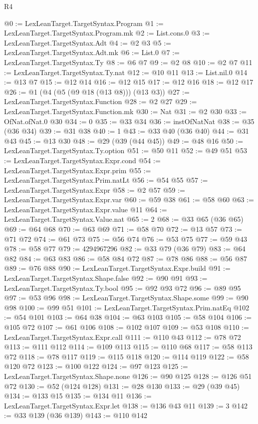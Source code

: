 \begin{lexlean}{R4}
\begin{coremodule}
@0 := LexLeanTarget.TargetSyntax.Program
@1 := LexLeanTarget.TargetSyntax.Program.mk
@2 := List.cons.{0}
@3 := LexLeanTarget.TargetSyntax.Adt
@4 := @2 @3
@5 := LexLeanTarget.TargetSyntax.Adt.mk
@6 := List.{0}
@7 := LexLeanTarget.TargetSyntax.Ty
@8 := @6 @7
@9 := @2 @8
@10 := @2 @7
@11 := LexLeanTarget.TargetSyntax.Ty.nat
@12 := @10 @11
@13 := List.nil.{0}
@14 := @13 @7
@15 := @12 @14
@16 := @12 @15
@17 := @12 @16
@18 := @12 @17
@26 := @1 (@4 (@5 (@9 @18 (@13 @8))) (@13 @3))
@27 := LexLeanTarget.TargetSyntax.Function
@28 := @2 @27
@29 := LexLeanTarget.TargetSyntax.Function.mk
@30 := Nat
@31 := @2 @30
@33 := OfNat.ofNat.{0} @30
@34 := 0
@35 := @33 @34
@36 := instOfNatNat
@38 := @35 (@36 @34)
@39 := @31 @38
@40 := 1
@43 := @33 @40 (@36 @40)
@44 := @31 @43
@45 := @13 @30
@48 := @29 (@39 (@44 @45))
@49 := @48 @16
@50 := LexLeanTarget.TargetSyntax.Ty.option
@51 := @50 @11
@52 := @49 @51
@53 := LexLeanTarget.TargetSyntax.Expr.cond
@54 := LexLeanTarget.TargetSyntax.Expr.prim
@55 := LexLeanTarget.TargetSyntax.Prim.natLt
@56 := @54 @55
@57 := LexLeanTarget.TargetSyntax.Expr
@58 := @2 @57
@59 := LexLeanTarget.TargetSyntax.Expr.var
@60 := @59 @38
@61 := @58 @60
@63 := LexLeanTarget.TargetSyntax.Expr.value @11
@64 := LexLeanTarget.TargetSyntax.Value.nat
@65 := 2
@68 := @33 @65 (@36 @65)
@69 := @64 @68
@70 := @63 @69
@71 := @58 @70
@72 := @13 @57
@73 := @71 @72
@74 := @61 @73
@75 := @56 @74
@76 := @53 @75
@77 := @59 @43
@78 := @58 @77
@79 := 4294967296
@82 := @33 @79 (@36 @79)
@83 := @64 @82
@84 := @63 @83
@86 := @58 @84 @72
@87 := @78 @86
@88 := @56 @87
@89 := @76 @88
@90 := LexLeanTarget.TargetSyntax.Expr.build
@91 := LexLeanTarget.TargetSyntax.Shape.false
@92 := @90 @91
@93 := LexLeanTarget.TargetSyntax.Ty.bool
@95 := @92 @93 @72
@96 := @89 @95
@97 := @53 @96
@98 := LexLeanTarget.TargetSyntax.Shape.some
@99 := @90 @98
@100 := @99 @51
@101 := LexLeanTarget.TargetSyntax.Prim.natEq
@102 := @54 @101
@103 := @64 @38
@104 := @63 @103
@105 := @58 @104
@106 := @105 @72
@107 := @61 @106
@108 := @102 @107
@109 := @53 @108
@110 := LexLeanTarget.TargetSyntax.Expr.call
@111 := @110 @43
@112 := @78 @72
@113 := @111 @112
@114 := @109 @113
@115 := @110 @68
@117 := @58 @113 @72
@118 := @78 @117
@119 := @115 @118
@120 := @114 @119
@122 := @58 @120 @72
@123 := @100 @122
@124 := @97 @123
@125 := LexLeanTarget.TargetSyntax.Shape.none
@126 := @90 @125
@128 := @126 @51 @72
@130 := @52 (@124 @128)
@131 := @28 @130
@133 := @29 (@39 @45)
@134 := @133 @15
@135 := @134 @11
@136 := LexLeanTarget.TargetSyntax.Expr.let
@138 := @136 @43 @11
@139 := 3
@142 := @33 @139 (@36 @139)
@143 := @110 @142

\end{coremodule}
\end{lexlean}
